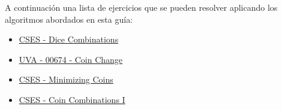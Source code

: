 A continuación una lista de ejercicios que se pueden resolver aplicando los algoritmos abordados en esta guía:

\begin{itemize}
	\item \href{https://cses.fi/problemset/task/1633}{CSES - Dice Combinations}
	\item \href{https://onlinejudge.org/index.php?option=onlinejudge&Itemid=8&page=show_problem&problem=615}{UVA - 00674 - Coin Change}
	\item \href{https://cses.fi/problemset/task/1634/}{CSES - Minimizing Coins}
	\item \href{https://cses.fi/problemset/task/1635/}{CSES - Coin Combinations I}
\end{itemize}